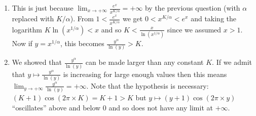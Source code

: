 \begin{enumerate}
  \item This is just because
    $\lim_{x\rightarrow +\infty} \frac{e^x}{x^{K/\alpha}} = +\infty$ by
    the previous question (with $\alpha$ replaced with $K/\alpha$).
    From $1 < \frac{e^x}{x^{K/\alpha}}$
    we get $0 < x^{K/\alpha} < e^x$ and taking the logarithm
    $K \ln{(x^{1/\alpha})} < x$ and so $K < \frac{x}{\ln{(x^{1/\alpha})}}$
    since we assumed $x > 1$.
    Now if $y = x^{1/\alpha}$, this becomes
    $\frac{y^\alpha}{\ln{(y)}} > K$.

  \item We showed that $\frac{y^\alpha}{\ln{(y)}}$ can be made larger than any
    constant $K$. If we admit that $y\mapsto \frac{y^\alpha}{\ln{(y)}}$
    is increasing for large enough values then this means
    ${\lim_{y \rightarrow +\infty} \frac{y^\alpha}{\ln{(y)}}} = +\infty$.
    Note that the hypothesis is necessary:
    ${(K+1)} \cos{(2\pi \times K)} = K+1 > K$ but
    $y \mapsto {(y+1) \cos{(2\pi \times y)}}$ ``oscillates'' above and below
    0 and so does not have any limit at $+\infty$.

\end{enumerate}
